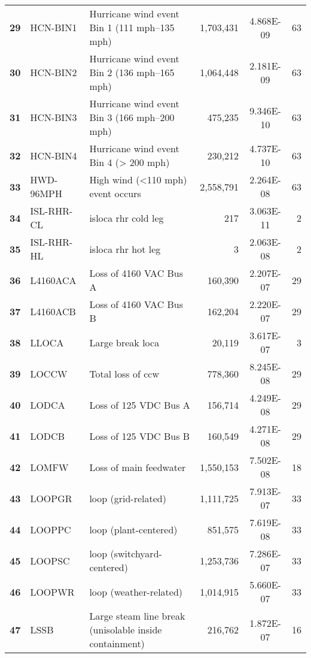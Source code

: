 \begin{longtable}{@{}lllrSr@{}}
\textbf{29} & HCN-BIN1         & Hurricane wind event Bin 1 (111 mph--135 mph) & 1,703,431 & 4.868E-09 & 63 \\
\textbf{30} & HCN-BIN2         & Hurricane wind event Bin 2 (136 mph--165 mph) & 1,064,448 & 2.181E-09 & 63 \\
\textbf{31} & HCN-BIN3         & Hurricane wind event Bin 3 (166 mph--200 mph) & 475,235   & 9.346E-10 & 63 \\
\textbf{32} & HCN-BIN4         & Hurricane wind event Bin 4 (> 200 mph) & 230,212   & 4.737E-10 & 63 \\
\textbf{33} & HWD-96MPH        & High wind (<110 mph) event occurs & 2,558,791 & 2.264E-08 & 63 \\
\textbf{34} & ISL-RHR-CL       & \acrshort{isloca} \acrshort{rhr} cold leg & 217       & 3.063E-11 & 2  \\
\textbf{35} & ISL-RHR-HL       & \acrshort{isloca} \acrshort{rhr} hot leg & 3         & 2.063E-08 & 2  \\
\textbf{36} & L4160ACA         & Loss of 4160 VAC Bus A & 160,390   & 2.207E-07 & 29 \\
\textbf{37} & L4160ACB         & Loss of 4160 VAC Bus B & 162,204   & 2.220E-07 & 29 \\
\textbf{38} & LLOCA            & Large break \acrshort{loca} & 20,119    & 3.617E-07 & 3  \\
\textbf{39} & LOCCW            & Total loss of \acrshort{ccw} & 778,360   & 8.245E-08 & 29 \\
\textbf{40} & LODCA            & Loss of 125 VDC Bus A & 156,714   & 4.249E-08 & 29 \\
\textbf{41} & LODCB            & Loss of 125 VDC Bus B & 160,549   & 4.271E-08 & 29 \\
\textbf{42} & LOMFW            & Loss of main feedwater & 1,550,153 & 7.502E-08 & 18 \\
\textbf{43} & LOOPGR           & \acrshort{loop} (grid-related) & 1,111,725 & 7.913E-07 & 33 \\
\textbf{44} & LOOPPC           & \acrshort{loop} (plant-centered) & 851,575   & 7.619E-08 & 33 \\
\textbf{45} & LOOPSC           & \acrshort{loop} (switchyard-centered) & 1,253,736 & 7.286E-07 & 33 \\
\textbf{46} & LOOPWR           & \acrshort{loop} (weather-related) & 1,014,915 & 5.660E-07 & 33 \\
\textbf{47} & LSSB             & Large steam line break (unisolable inside containment) & 216,762   & 1.872E-07 & 16 \\

\end{longtable}
